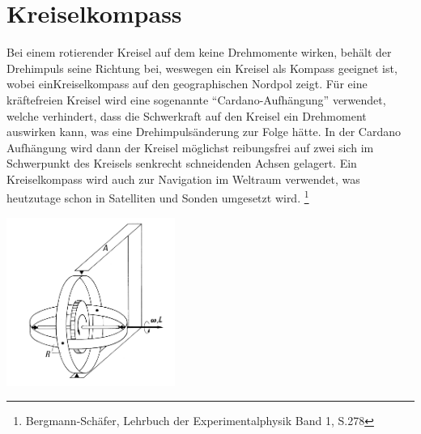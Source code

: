 

\section{Kreiselkompass}
Bei einem rotierender Kreisel auf dem keine Drehmomente wirken, behält der Drehimpuls seine Richtung bei, weswegen ein Kreisel als Kompass geeignet ist, wobei einKreiselkompass auf den geographischen Nordpol zeigt. Für eine kräftefreien Kreisel wird eine sogenannte \enquote{Cardano-Aufhängung} verwendet, welche verhindert, dass die Schwerkraft auf den Kreisel ein Drehmoment auswirken kann, was eine Drehimpulsänderung zur Folge hätte. In der Cardano Aufhängung wird dann der Kreisel möglichst reibungsfrei auf zwei sich im Schwerpunkt des Kreisels senkrecht schneidenden Achsen gelagert. Ein Kreiselkompass wird auch zur Navigation im Weltraum verwendet, was heutzutage schon in Satelliten und Sonden umgesetzt wird. \footnote{Bergmann-Schäfer, Lehrbuch der Experimentalphysik Band 1, S.278}
\begin{center}
    \includegraphics[width = 5.5cm]{Bilder/Kraeftefreie_Aufhaengung.PNG}
\end{center}
